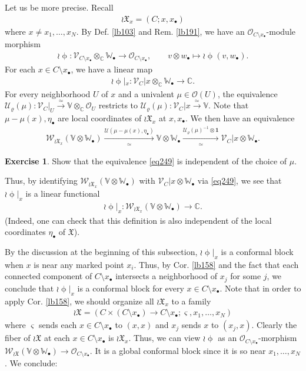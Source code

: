 \documentclass[12pt,a4paper,notitlepage]{article}
\theoremstyle{definition}
\newtheorem{exe}[df]{Exercise}
\theoremstyle{plain}
\newcommand{\fk}{\mathfrak}
\newcommand{\mc}{\mathcal}
\newcommand{\id}{\mathbf{1}}
\newcommand{\scr}{\mathscr}
\newcommand{\sgm}{\varsigma}
\newcommand{\blt}{\bullet}
\newcommand{\Vbb}{\mathbb V}
\newcommand{\Wbb}{\mathbb W}
\newcommand{\Cbb}{\mathbb C}
\numberwithin{equation}{section}
\begin{document}
Let us be more precise. Recall
\begin{align}
\wr\fk X_x=(C;x,x_\blt)
\end{align}
where $x\neq x_1,\dots,x_N$. By Def. \ref{lb103} and Rem. \ref{lb191}, we have an $\scr O_{C\setminus x_\blt}$-module morphism
\begin{align}
\wr\upphi:\scr V_{C\setminus x_\blt}\otimes_\Cbb\Wbb_\blt\rightarrow\scr O_{C\setminus x_\blt},\qquad v\otimes w_\blt\mapsto\wr\upphi(v,w_\blt).
\end{align}
For each $x\in C\setminus x_\blt$, we have a linear map
\begin{align}
\wr\upphi|_x:\scr V_C|x\otimes_\Cbb\Wbb_\blt\rightarrow\Cbb.
\end{align}
For every neighborhood $U$ of $x$ and a univalent $\mu\in\scr O(U)$, the equivalence $\mc U_\varrho(\mu):\scr V_C|_U\xrightarrow{\simeq}\Vbb\otimes_\Cbb\scr O_U$ restricts to $\mc U_\varrho(\mu):\scr V_C|x\xrightarrow{\simeq}\Vbb$. Note that $\mu-\mu(x),\eta_\blt$ are local coordinates of $\wr\fk X_x$ at $x,x_\blt$. We then have an equivalence
\begin{align}
\scr W_{\wr\fk X_x}(\Vbb\otimes\Wbb_\blt)\xrightarrow[\simeq]{\mc U(\mu-\mu(x),\eta_\blt)} \Vbb\otimes\Wbb_\blt\xrightarrow[\simeq]{\mc U_\varrho(\mu)^{-1}\otimes\id}\scr V_C|x\otimes\Wbb_\blt.\label{eq249}
\end{align}
\begin{exe}
Show that the equivalence \eqref{eq249} is independent of the choice of $\mu$.
\end{exe}
Thus, by identifying $\scr W_{\wr\fk X_x}(\Vbb\otimes\Wbb_\blt)$ with $\scr V_C|x\otimes\Wbb_\blt$ via \eqref{eq249}, we see that $\wr\upphi|_x$ is a linear functional
\begin{align}
\wr\upphi|_x:\scr W_{\wr\fk X_x}(\Vbb\otimes\Wbb_\blt)\rightarrow\Cbb.
\end{align}
(Indeed, one can check that this definition is also independent of the local coordinates $\eta_\blt$ of $\fk X$).

By the discussion at the beginning of this subsection, $\wr\upphi|_x$ is a conformal block when $x$ is near any marked point $x_i$. Thus,  by Cor. \ref{lb158} and the fact that each connected component of $C\setminus x_\blt$ intersects a neighborhood of $x_j$ for some $j$, we conclude that $\wr\upphi|_x$ is a conformal block for every $x\in C\setminus x_\blt$. Note that in order to apply Cor. \ref{lb158}, we should organize all $\wr\fk X_x$ to a family
\begin{align}
\wr\fk X=(C\times (C\setminus x_\blt)\rightarrow C\setminus x_\blt;\sgm,x_1,\dots,x_N)
\end{align}
where $\sgm$ sends each $x\in C\setminus x_\blt$ to $(x,x)$ and $x_j$ sends $x$ to $(x_j,x)$. Clearly the fiber of $\wr\fk X$ at each $x\in C\setminus x_\blt$ is $\wr\fk X_x$. Thus, we can view $\wr\upphi$ as an $\scr O_{C\setminus x_\blt}$-morphism $\scr W_{\wr\fk X}(\Vbb\otimes\Wbb_\blt)\rightarrow\scr O_{C\setminus x_\blt}$. It is a global conformal block since it is so near $x_1,\dots,x_N$. We conclude:
\end{document}
